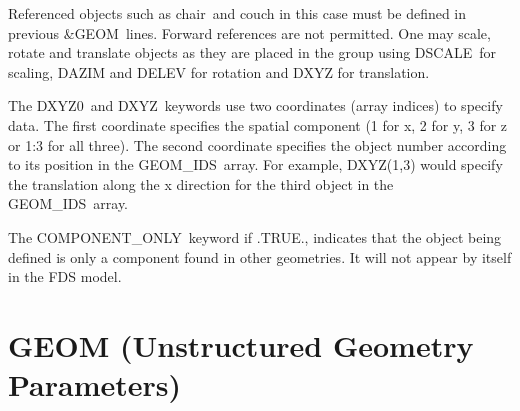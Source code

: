 \documentclass[12pt]{article}
\begin{document}
\noindent Referenced objects such as {\ct chair}\ and {\ct couch} in this case must be defined in
previous {\&GEOM}\ lines.  Forward references are not permitted.
One may scale, rotate and translate objects as they are placed in the group using
{\ct DSCALE}\, for scaling, {\ct DAZIM} and {\ct DELEV} for rotation and {\ct DXYZ} for translation.

The {\ct DXYZ0}\ and {\ct DXYZ}\ keywords use two coordinates (array indices) to specify data.
The first coordinate specifies the spatial component (1 for x, 2 for y, 3 for z or 1:3 for all three).
The second coordinate specifies the object number according to its position in the {\ct GEOM\_IDS}\ array.
For example,
DXYZ(1,3) would specify the translation along the x direction for the third object in the {\ct GEOM\_IDS}\ array.

The {\ct COMPONENT\_ONLY}\ keyword if .TRUE., indicates that the object being defined is only a component found in other geometries.
It will not appear by itself in the FDS model.

%

\section{\texorpdfstring{{\ct GEOM}}{GEOM} (Unstructured Geometry Parameters)}
\end{document}
